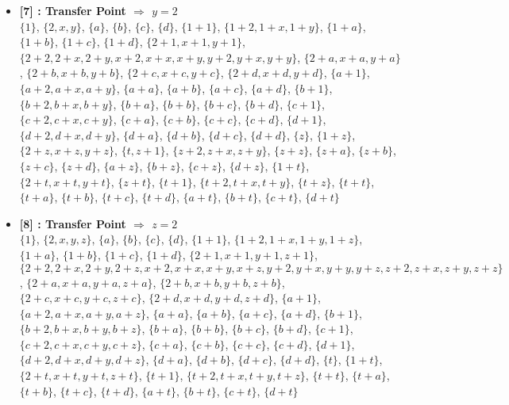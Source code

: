 \begin{itemize}
    \item \textbf{[7] : Transfer Point $\Rightarrow$ $y = 2$}\\
        $\{1\}$, $\{2, x, y\}$, $\{a\}$, $\{b\}$, $\{c\}$, $\{d\}$, $\{1 + 1\}$, $\{1 + 2, 1 + x, 1 + y\}$, $\{1 + a\}$, $\{1 + b\}$, $\{1 + c\}$, $\{1 + d\}$, $\{2 + 1, x + 1, y + 1\}$, $\{2 + 2, 2 + x, 2 + y, x + 2, x + x, x + y, y + 2, y + x, y + y\}$, $\{2 + a, x + a, y + a\}$, $\{2 + b, x + b, y + b\}$, $\{2 + c, x + c, y + c\}$, $\{2 + d, x + d, y + d\}$, $\{a + 1\}$, $\{a + 2, a + x, a + y\}$, $\{a + a\}$, $\{a + b\}$, $\{a + c\}$, $\{a + d\}$, $\{b + 1\}$, $\{b + 2, b + x, b + y\}$, $\{b + a\}$, $\{b + b\}$, $\{b + c\}$, $\{b + d\}$, $\{c + 1\}$, $\{c + 2, c + x, c + y\}$, $\{c + a\}$, $\{c + b\}$, $\{c + c\}$, $\{c + d\}$, $\{d + 1\}$, $\{d + 2, d + x, d + y\}$, $\{d + a\}$, $\{d + b\}$, $\{d + c\}$, $\{d + d\}$, $\{z\}$, $\{1 + z\}$, $\{2 + z, x + z, y + z\}$, $\{t, z + 1\}$, $\{z + 2, z + x, z + y\}$, $\{z + z\}$, $\{z + a\}$, $\{z + b\}$, $\{z + c\}$, $\{z + d\}$, $\{a + z\}$, $\{b + z\}$, $\{c + z\}$, $\{d + z\}$, $\{1 + t\}$, $\{2 + t, x + t, y + t\}$, $\{z + t\}$, $\{t + 1\}$, $\{t + 2, t + x, t + y\}$, $\{t + z\}$, $\{t + t\}$, $\{t + a\}$, $\{t + b\}$, $\{t + c\}$, $\{t + d\}$, $\{a + t\}$, $\{b + t\}$, $\{c + t\}$, $\{d + t\}$

    \item \textbf{[8] : Transfer Point $\Rightarrow$ $z = 2$}\\
        $\{1\}$, $\{2, x, y, z\}$, $\{a\}$, $\{b\}$, $\{c\}$, $\{d\}$, $\{1 + 1\}$, $\{1 + 2, 1 + x, 1 + y, 1 + z\}$, $\{1 + a\}$, $\{1 + b\}$, $\{1 + c\}$, $\{1 + d\}$, $\{2 + 1, x + 1, y + 1, z + 1\}$, $\{2 + 2, 2 + x, 2 + y, 2 + z, x + 2, x + x, x + y, x + z, y + 2, y + x, y + y, y + z, z + 2, z + x, z + y, z + z\}$, $\{2 + a, x + a, y + a, z + a\}$, $\{2 + b, x + b, y + b, z + b\}$, $\{2 + c, x + c, y + c, z + c\}$, $\{2 + d, x + d, y + d, z + d\}$, $\{a + 1\}$, $\{a + 2, a + x, a + y, a + z\}$, $\{a + a\}$, $\{a + b\}$, $\{a + c\}$, $\{a + d\}$, $\{b + 1\}$, $\{b + 2, b + x, b + y, b + z\}$, $\{b + a\}$, $\{b + b\}$, $\{b + c\}$, $\{b + d\}$, $\{c + 1\}$, $\{c + 2, c + x, c + y, c + z\}$, $\{c + a\}$, $\{c + b\}$, $\{c + c\}$, $\{c + d\}$, $\{d + 1\}$, $\{d + 2, d + x, d + y, d + z\}$, $\{d + a\}$, $\{d + b\}$, $\{d + c\}$, $\{d + d\}$, $\{t\}$, $\{1 + t\}$, $\{2 + t, x + t, y + t, z + t\}$, $\{t + 1\}$, $\{t + 2, t + x, t + y, t + z\}$, $\{t + t\}$, $\{t + a\}$, $\{t + b\}$, $\{t + c\}$, $\{t + d\}$, $\{a + t\}$, $\{b + t\}$, $\{c + t\}$, $\{d + t\}$


\end{itemize}
